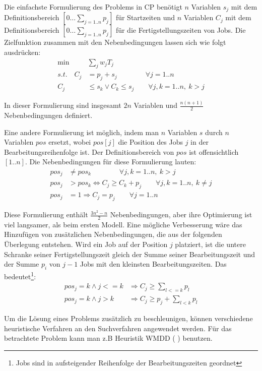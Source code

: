 Die einfachste Formulierung des Problems in CP benötigt $n$ Variablen $s_j$ mit dem Definitionsbereich $[0\dots \sum_{j=1..n}p_j]$ für Startzeiten und $n$ Variablen $C_j$ mit dem Definitionsbereich $[0\dots \sum_{j=1..n}p_j]$ für die Fertigstellungszeiten von Jobs. Die Zielfunktion zusammen mit den Nebenbedingungen lassen sich wie folgt ausdrücken:
\begin{align}
 \min & \sum_{j}{w_jT_j} \nonumber \\
 s.t.\quad C_j & = p_j + s_j\qquad\qquad \forall j=1..n \nonumber \\
 C_j  & \le s_k \vee  C_k \le s_j \qquad \forall j,k=1..n,\ k>j \nonumber
\end{align}

In dieser Formulierung sind insgesamt $2n$ Variablen und $\frac{n(n+1)}{2}$ Nebenbedingungen definiert.

Eine andere Formulierung ist möglich, indem man $n$ Variablen $s$ durch $n$ Variablen $pos$ ersetzt, wobei $pos[j]$ die Position des Jobs $j$ in der Bearbeitungsreihenfolge ist. Der Definitionsbereich von $pos$ ist offensichtlich $[1..n]$. Die Nebenbedingungen für diese Formulierung lauten:
\begin{align}
 pos_j & \not= pos_k\qquad\qquad \forall j,k=1..n,\ k>j \nonumber \\
 pos_j  & > pos_k \Leftrightarrow  C_j \ge C_k + p_j \qquad \forall j,k=1..n,\ k\not=j \nonumber \\
 pos_j  & = 1 \Rightarrow C_j=p_j \qquad \forall j=1..n \nonumber
\end{align}

Diese Formulierung enthält  $\frac{3n^2-n}{2}$ Nebenbedingungen, aber ihre Optimierung ist viel langsamer, als beim ersten Modell. Eine mögliche Verbesserung wäre das Hinzufügen von zusätzlichen Nebenbedingungen, die aus der folgenden Überlegung entstehen. Wird ein Job auf der Position $j$ platziert, ist die untere Schranke seiner Fertigstellungszeit gleich der Summe seiner Bearbeitungszeit und der Summe $p_i$ von $j-1$ Jobs mit den kleinsten Bearbeitungszeiten. Das bedeutet\footnote{Jobs sind in aufsteigender Reihenfolge der Bearbeitungszeiten geordnet}:
\begin{align}
  pos_j=k \wedge j<=k  & \Rightarrow C_j \ge \sum_{l<=k} p_l \nonumber \\
  pos_j=k \wedge j>k  & \Rightarrow C_j \ge p_j+\sum_{l<k} p_l \nonumber 
\end{align}

Um die Lösung eines Problems zusätzlich zu beschleunigen, können verschiedene heuristische Verfahren an den Suchverfahren angewendet werden. Für das betrachtete Problem kann man z.B Heuristik WMDD ( \grqq)  \citep[siehe][]{WMDD} benutzen.

